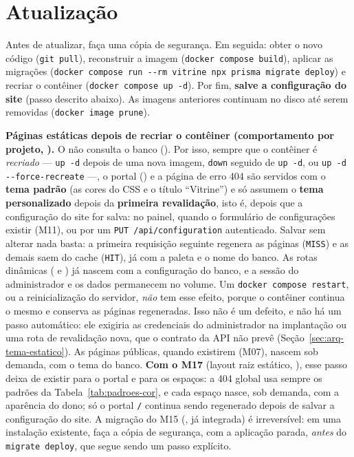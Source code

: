 \section{Atualização}

Antes de atualizar, faça uma cópia de segurança. Em seguida: obter o novo código (\texttt{git pull}), reconstruir a imagem (\texttt{docker compose build}), aplicar as migrações (\texttt{docker compose run -{}-rm vitrine npx prisma migrate deploy}) e recriar o contêiner (\texttt{docker compose up -d}). Por fim, \textbf{salve a configuração do site} (passo descrito abaixo). As imagens anteriores continuam no disco até serem removidas (\texttt{docker image prune}).

\textbf{Páginas estáticas depois de recriar o contêiner (comportamento por projeto, ).} O  não consulta o banco (). Por isso, sempre que o contêiner é \emph{recriado} --- \texttt{up -d} depois de uma nova imagem, \texttt{down} seguido de \texttt{up -d}, ou \texttt{up -d -{}-force-recreate} ---, o portal (\arq{/}) e a página de erro 404 são servidos com o \textbf{tema padrão} (as cores do CSS e o título ``Vitrine'') e só assumem o \textbf{tema personalizado} depois da \textbf{primeira revalidação}, isto é, depois que a configuração do site for salva: no painel, quando o formulário de configurações existir (M11), ou por um \texttt{PUT /api/configuration} autenticado. Salvar sem alterar nada basta: a primeira requisição seguinte regenera as páginas (\texttt{MISS}) e as demais saem do cache (\texttt{HIT}), já com a paleta e o nome do banco. As rotas dinâmicas ( e ) já nascem com a configuração do banco, e a sessão do administrador e os dados permanecem no volume. Um \texttt{docker compose restart}, ou a reinicialização do servidor, \emph{não} tem esse efeito, porque o contêiner continua o mesmo e conserva as páginas regeneradas. Isso não é um defeito, e não há um passo automático: ele exigiria as credenciais do administrador na implantação ou uma rota de revalidação nova, que o contrato da API não prevê (Seção~\ref{sec:arq-tema-estatico}). As páginas públicas, quando existirem (M07), nascem sob demanda, com o tema do banco. \textbf{Com o M17} (layout raiz estático, ), esse passo deixa de existir para o portal e para os espaços: a 404 global usa sempre os padrões da Tabela~\ref{tab:padroes-cor}, e cada espaço nasce, sob demanda, com a aparência do dono; só o portal \texttt{/} continua sendo regenerado depois de salvar a configuração do site. A migração do M15 (, já integrada) é irreversível: em uma instalação existente, faça a cópia de segurança, com a aplicação parada, \emph{antes} do \texttt{migrate deploy}, que segue sendo um passo explícito.

